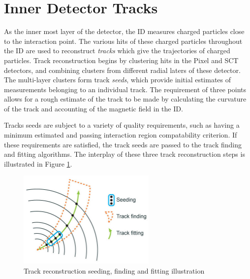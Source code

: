 \section{Inner Detector Tracks}
\label{sec:inner_det_tracks}
As the inner most layer of the detector, the ID measures charged particles close to the interaction point. The various hits of these charged particles throughout the ID are used to reconstruct \textit{tracks} which give the trajectories of charged particles. Track reconstruction begins by clustering hits in the Pixel and SCT detectors, and combining clusters from different radial laters of these detector. The multi-layer clusters form track \textit{seeds}, which provide initial estimates of measurements belonging to an individual track. The requirement of three points allows for a rough estimate of the track \pt to be made by calculating the curvature of the track and accounting of the magnetic field in the ID. \par

Tracks seeds are subject to a variety of quality requirements, such as having a minimum estimated \pt and passing interaction region compatability criterion. If these requirements are satisfied, the track seeds are passed to the track finding and fitting algorithms. The interplay of these three track reconstruction steps is illustrated in Figure \ref{fig:track_reco}. 

\begin{figure}
        \centering
	\includegraphics[width=0.6\textwidth]{figures/ch5/track_reco}
	\caption{Track reconstruction seeding, finding and fitting illustration \cite{track_finding}}
	\label{fig:track_reco}
\end{figure}

